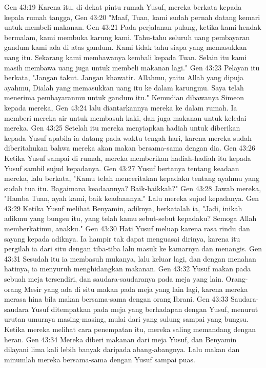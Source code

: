 Gen 43:19  Karena itu, di dekat pintu rumah Yusuf, mereka berkata kepada kepala rumah tangga,
Gen 43:20  "Maaf, Tuan, kami sudah pernah datang kemari untuk membeli makanan.
Gen 43:21  Pada perjalanan pulang, ketika kami hendak bermalam, kami membuka karung kami. Tahu-tahu seluruh uang pembayaran gandum kami ada di atas gandum. Kami tidak tahu siapa yang memasukkan uang itu. Sekarang kami membawanya kembali kepada Tuan. Selain itu kami masih membawa uang juga untuk membeli makanan lagi."
Gen 43:23  Pelayan itu berkata, "Jangan takut. Jangan khawatir. Allahmu, yaitu Allah yang dipuja ayahmu, Dialah yang memasukkan uang itu ke dalam karungmu. Saya telah menerima pembayaranmu untuk gandum itu." Kemudian dibawanya Simeon kepada mereka,
Gen 43:24  lalu diantarkannya mereka ke dalam rumah. Ia memberi mereka air untuk membasuh kaki, dan juga makanan untuk keledai mereka.
Gen 43:25  Setelah itu mereka menyiapkan hadiah untuk diberikan kepada Yusuf apabila ia datang pada waktu tengah hari, karena mereka sudah diberitahukan bahwa mereka akan makan bersama-sama dengan dia.
Gen 43:26  Ketika Yusuf sampai di rumah, mereka memberikan hadiah-hadiah itu kepada Yusuf sambil sujud kepadanya.
Gen 43:27  Yusuf bertanya tentang keadaan mereka, lalu berkata, "Kamu telah menceritakan kepadaku tentang ayahmu yang sudah tua itu. Bagaimana keadaannya? Baik-baikkah?"
Gen 43:28  Jawab mereka, "Hamba Tuan, ayah kami, baik keadaannya." Lalu mereka sujud kepadanya.
Gen 43:29  Ketika Yusuf melihat Benyamin, adiknya, berkatalah ia, "Jadi, inikah adikmu yang bungsu itu, yang telah kamu sebut-sebut kepadaku? Semoga Allah memberkatimu, anakku."
Gen 43:30  Hati Yusuf meluap karena rasa rindu dan sayang kepada adiknya. Ia hampir tak dapat menguasai dirinya, karena itu pergilah ia dari situ dengan tiba-tiba lalu masuk ke kamarnya dan menangis.
Gen 43:31  Sesudah itu ia membasuh mukanya, lalu keluar lagi, dan dengan menahan hatinya, ia menyuruh menghidangkan makanan.
Gen 43:32  Yusuf makan pada sebuah meja tersendiri, dan saudara-saudaranya pada meja yang lain. Orang-orang Mesir yang ada di situ makan pada meja yang lain lagi, karena mereka merasa hina bila makan bersama-sama dengan orang Ibrani.
Gen 43:33  Saudara-saudara Yusuf ditempatkan pada meja yang berhadapan dengan Yusuf, menurut urutan umurnya masing-masing, mulai dari yang sulung sampai yang bungsu. Ketika mereka melihat cara penempatan itu, mereka saling memandang dengan heran.
Gen 43:34  Mereka diberi makanan dari meja Yusuf, dan Benyamin dilayani lima kali lebih banyak daripada abang-abangnya. Lalu makan dan minumlah mereka bersama-sama dengan Yusuf sampai puas.
